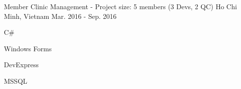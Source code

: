 \begin{cventries}
  \cventry
    {Member} %
    {Clinic Management - Project size: 5 members (3 Devs, 2 QC)} %
    {Ho Chi Minh, Vietnam} %
    {Mar. 2016 - Sep. 2016} %
    {
      \begin{cvitems} %
        \item {C\#}
        \item {Windows Forms}
        \item {DevExpress}
        \item {MSSQL}
      \end{cvitems}
    }

\end{cventries}
